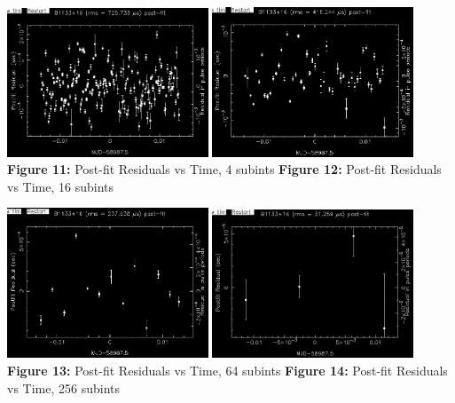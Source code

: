 \documentclass{article_saj}
\begin{document}
\begin{strip}
  \begin{center}
    \includegraphics[width=0.45\textwidth]{Plots/tempo4_edit.png}
    \hspace{0.04\textwidth}
    \includegraphics[width=0.45\textwidth]{Plots/tempo5_edit.png}
    \textbf{Figure 11:} Post-fit Residuals vs Time, 4 subints \hspace*{0.5cm} \textbf{Figure 12:} Post-fit Residuals vs Time, 16 subints
  \end{center}

  \vspace{4mm}
  \begin{center}
    \includegraphics[width=0.45\textwidth]{Plots/tempo6_edit.png}    
    \hspace{0.04\textwidth}
    \includegraphics[width=0.45\textwidth]{Plots/tempo7_edit.png}
    \textbf{Figure 13:} Post-fit Residuals vs Time, 64 subints \hspace*{0.5cm} \textbf{Figure 14:} Post-fit Residuals vs Time, 256 subints
  \end{center}
\end{strip}
\end{document}
